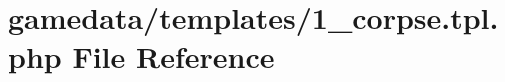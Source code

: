 \hypertarget{1__corpse_8tpl_8php}{\section{gamedata/templates/1\+\_\+corpse.tpl.\+php File Reference}
\label{1__corpse_8tpl_8php}
}
